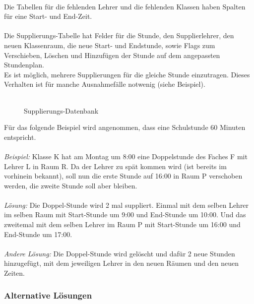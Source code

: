 \\
Die Tabellen für die fehlenden Lehrer und die fehlenden Klassen haben Spalten für eine Start- und End-Zeit.\\
\\
Die Supplierungs-Tabelle hat Felder für die Stunde, den Supplierlehrer, den neuen Klassenraum, die neue Start- und Endstunde, sowie Flags zum Verschieben, Löschen und Hinzufügen der Stunde auf dem angepassten Stundenplan.\\
Es ist möglich, mehrere Supplierungen für die gleiche Stunde einzutragen. Dieses Verhalten ist für manche Ausnahmefälle notwenig (siehe Beispiel).\\
\\
\begin{figure}[H]
\centering
{}
\caption{Supplierungs-Datenbank}
\end{figure}
Für das folgende Beispiel wird angenommen, dass eine Schulstunde 60 Minuten entspricht.\\
\\
\textit{Beispiel:} Klasse K hat am Montag um 8:00 eine Doppelstunde des Faches F mit Lehrer L in Raum R. Da der Lehrer zu spät kommen wird (ist bereits im vorhinein bekannt), soll nun die erste Stunde auf 16:00 in Raum P verschoben werden, die zweite Stunde soll aber bleiben.\\
\\
\textit{Lösung:} Die Doppel-Stunde wird 2 mal suppliert. Einmal mit dem selben Lehrer im selben Raum mit Start-Stunde um 9:00 und End-Stunde um 10:00. Und das zweitemal mit dem selben Lehrer im Raum P mit Start-Stunde um 16:00 und End-Stunde um 17:00.\\
\\
\textit{Andere Lösung:} Die Doppel-Stunde wird gelöscht und dafür 2 neue Stunden hinzugefügt, mit dem jeweiligen Lehrer in den neuen Räumen und den neuen Zeiten.

\subsubsection{Alternative Lösungen}


